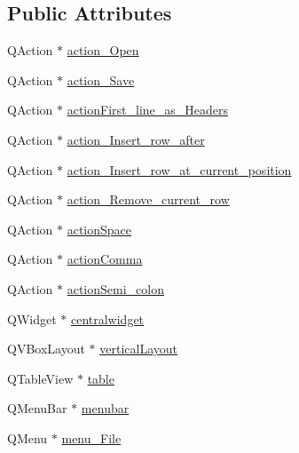 \subsection*{Public Attributes}
\begin{DoxyCompactItemize}
\item 
Q\+Action $\ast$ \mbox{\hyperlink{class_ui___csv_editor_aee5ee3423b883e088976f0bd4fff6464}{action\+\_\+\+Open}}
\item 
Q\+Action $\ast$ \mbox{\hyperlink{class_ui___csv_editor_a522776e3830a526ac8f2fa800671712a}{action\+\_\+\+Save}}
\item 
Q\+Action $\ast$ \mbox{\hyperlink{class_ui___csv_editor_a1e5f1160a398ab8fb711bc08cebb05c1}{action\+First\+\_\+line\+\_\+as\+\_\+\+Headers}}
\item 
Q\+Action $\ast$ \mbox{\hyperlink{class_ui___csv_editor_ae8800f43aa0d08b8aebcfba88ee4644c}{action\+\_\+\+Insert\+\_\+row\+\_\+after}}
\item 
Q\+Action $\ast$ \mbox{\hyperlink{class_ui___csv_editor_a48b0aa9b0d6677bde72eeacc221dc384}{action\+\_\+\+Insert\+\_\+row\+\_\+at\+\_\+current\+\_\+position}}
\item 
Q\+Action $\ast$ \mbox{\hyperlink{class_ui___csv_editor_a4f9f83d4c0b7e26f2393c69de344249d}{action\+\_\+\+Remove\+\_\+current\+\_\+row}}
\item 
Q\+Action $\ast$ \mbox{\hyperlink{class_ui___csv_editor_a1b34d42a7a606b1216f0f66d9a712906}{action\+Space}}
\item 
Q\+Action $\ast$ \mbox{\hyperlink{class_ui___csv_editor_a805d2d0e842d6bdafa6ef596c35ddd1c}{action\+Comma}}
\item 
Q\+Action $\ast$ \mbox{\hyperlink{class_ui___csv_editor_a1f40fba3a5f7ef3b83fdeb71ef15cb9b}{action\+Semi\+\_\+colon}}
\item 
Q\+Widget $\ast$ \mbox{\hyperlink{class_ui___csv_editor_aa7e84c11663dd97c1c77e32f00551809}{centralwidget}}
\item 
Q\+V\+Box\+Layout $\ast$ \mbox{\hyperlink{class_ui___csv_editor_a9dd49f17878a52494b4ba0354c836b67}{vertical\+Layout}}
\item 
Q\+Table\+View $\ast$ \mbox{\hyperlink{class_ui___csv_editor_ae96796346d8f73457dfe602e8562a9f1}{table}}
\item 
Q\+Menu\+Bar $\ast$ \mbox{\hyperlink{class_ui___csv_editor_a4ec0f558596f0ca8dd1d34db31e37da6}{menubar}}
\item 
Q\+Menu $\ast$ \mbox{\hyperlink{class_ui___csv_editor_a20552e16688dd857132304d816bda522}{menu\+\_\+\+File}}
\item 

\end{DoxyCompactItemize}
